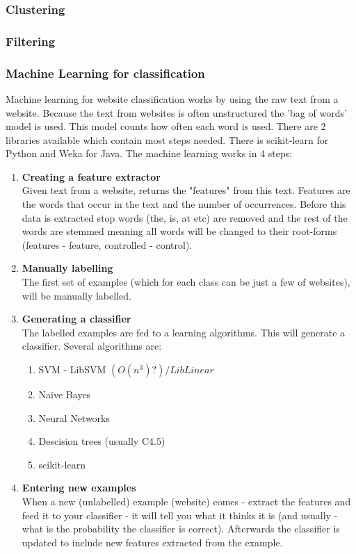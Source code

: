 \subsubsection{Clustering}
\subsubsection{Filtering}
\subsubsection{Machine Learning for classification}
Machine learning for website classification works by using the raw text from a website. Because the text from websites is often unstructured the 'bag of words' model is used. This model counts how often each word is used. There are 2 libraries available which contain most steps needed. There is scikit-learn for Python and Weka for Java.
The machine learning works in 4 steps:
\begin{enumerate}
    \item \textbf{Creating a feature extractor} \\
    Given text from a website, returns the "features" from this text. Features are the words that occur in the text and the number of occurrences. Before this data is extracted stop words (the, is, at etc) are removed and the rest of the words are stemmed meaning all words will be changed to their root-forms (features - feature, controlled - control).
    \item \textbf{Manually labelling} \\
    The first set of examples (which for each class can be just a few of websites), will be manually labelled. 
    \item \textbf{Generating a classifier} \\
    The labelled examples are fed to a learning algorithms. This will generate a classifier. Several algorithms are:
    \begin{enumerate}
        \item SVM - LibSVM $(O(n^3)?) / LibLinear$
        \item Naive Bayes
        \item Neural Networks
        \item Descision trees (usually C4.5)
        \item scikit-learn
    \end{enumerate}
    \item \textbf{Entering new examples} \\
    When a new (unlabelled) example (website) comes - extract the features and feed it to your classifier - it will tell you what it thinks it is (and usually - what is the probability the classifier is correct). Afterwards the classifier is updated to include new features extracted from the example.
\end{enumerate}

